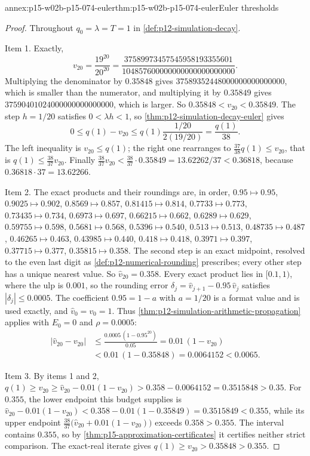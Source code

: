 \begin{annexitem}{annex:p15-w02b-p15-074-euler}{thm:p15-w02b-p15-074-euler}{Euler thresholds}
\begin{proof}
Throughout \(q_0=\lambda=T=1\) in \cref{def:p12-simulation-decay}.

Item 1. Exactly,
\[
 v_{20}=\frac{19^{20}}{20^{20}}
 =\frac{37589973457545958193355601}{104857600000000000000000000}.
\]
Multiplying the denominator by \(0.35848\) gives
\(37589352448000000000000000\), which is smaller than the numerator, and
multiplying it by \(0.35849\) gives \(37590401024000000000000000\), which is
larger. So \(0.35848<v_{20}<0.35849\). The step \(h=1/20\) satisfies
\(0<\lambda h<1\), so \cref{thm:p12-simulation-decay-euler} gives
\[
 0\leq q(1)-v_{20}\leq q(1)\frac{1/20}{2(19/20)}=\frac{q(1)}{38}.
\]
The left inequality is \(v_{20}\leq q(1)\); the right one rearranges to
\(\tfrac{37}{38}q(1)\leq v_{20}\), that is \(q(1)\leq\tfrac{38}{37}v_{20}\).
Finally \(\tfrac{38}{37}v_{20}<\tfrac{38}{37}\cdot0.35849
=13.62262/37<0.36818\), because \(0.36818\cdot37=13.62266\).

Item 2. The exact products and their roundings are, in order,
\(0.95\mapsto0.95\), \(0.9025\mapsto0.902\), \(0.8569\mapsto0.857\),
\(0.81415\mapsto0.814\), \(0.7733\mapsto0.773\), \(0.73435\mapsto0.734\),
\(0.6973\mapsto0.697\), \(0.66215\mapsto0.662\), \(0.6289\mapsto0.629\),
\(0.59755\mapsto0.598\), \(0.5681\mapsto0.568\), \(0.5396\mapsto0.540\),
\(0.513\mapsto0.513\), \(0.48735\mapsto0.487\), \(0.46265\mapsto0.463\),
\(0.43985\mapsto0.440\), \(0.418\mapsto0.418\), \(0.3971\mapsto0.397\),
\(0.37715\mapsto0.377\), \(0.35815\mapsto0.358\).
The second step is an exact midpoint, resolved to the even last digit as
\cref{def:p12-numerical-rounding} prescribes; every other step has a unique
nearest value. So \(\widehat v_{20}=0.358\). Every exact product lies in
\([0.1,1)\), where the ulp is \(0.001\), so the rounding error
\(\delta_j=\widehat v_{j+1}-0.95\,\widehat v_j\) satisfies
\(|\delta_j|\leq0.0005\). The coefficient \(0.95=1-a\) with \(a=1/20\) is a
format value and is used exactly, and \(\widehat v_0=v_0=1\). Thus
\cref{thm:p12-simulation-arithmetic-propagation} applies with \(E_0=0\) and
\(\rho=0.0005\):
\[
\begin{aligned}
 |\widehat v_{20}-v_{20}|&\leq\frac{0.0005\,(1-0.95^{20})}{0.05}
 =0.01\,(1-v_{20})\\
 &<0.01\,(1-0.35848)=0.0064152<0.0065.
\end{aligned}
\]

Item 3. By items 1 and 2,
\(q(1)\geq v_{20}\geq\widehat v_{20}-0.01(1-v_{20})>0.358-0.0064152
=0.3515848>0.35\). For \(0.355\), the lower endpoint this budget supplies
is \(\widehat v_{20}-0.01(1-v_{20})<0.358-0.01(1-0.35849)=0.3515849<0.355\),
while its upper endpoint \(\tfrac{38}{37}\bigl(\widehat v_{20}
+0.01(1-v_{20})\bigr)\) exceeds \(0.358>0.355\). The interval contains
\(0.355\), so by \cref{thm:p15-approximation-certificates} it certifies
neither strict comparison. The exact-real iterate gives
\(q(1)\geq v_{20}>0.35848>0.355\).


\end{proof}
\end{annexitem}
